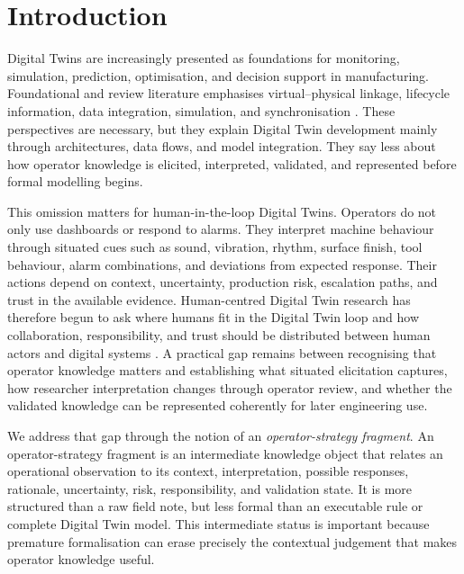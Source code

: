 \section{Introduction}
\label{sec:introduction}

Digital Twins are increasingly presented as foundations for monitoring, simulation, prediction, optimisation, and decision support in manufacturing. Foundational and review literature emphasises virtual--physical linkage, lifecycle information, data integration, simulation, and synchronisation \cite{grieves2017digital,kritzinger2018digital,fuller2020digital,negri2017review,semeraro2021digital}. These perspectives are necessary, but they explain Digital Twin development mainly through architectures, data flows, and model integration. They say less about how operator knowledge is elicited, interpreted, validated, and represented before formal modelling begins.

This omission matters for human-\allowbreak in-\allowbreak the-\allowbreak loop Digital Twins. Operators do not only use dashboards or respond to alarms. They interpret machine behaviour through situated cues such as sound, vibration, rhythm, surface finish, tool behaviour, alarm combinations, and deviations from expected response. Their actions depend on context, uncertainty, production risk, escalation paths, and trust in the available evidence. Human-centred Digital Twin research has therefore begun to ask where humans fit in the Digital Twin loop and how collaboration, responsibility, and trust should be distributed between human actors and digital systems \cite{agrawal2023humans,longo2022ubiquitous,lee2004trust,parasuraman2000levels}. A practical gap remains between recognising that operator knowledge matters and establishing what situated elicitation captures, how researcher interpretation changes through operator review, and whether the validated knowledge can be represented coherently for later engineering use.

We address that gap through the notion of an \emph{operator-strategy fragment}. An operator-strategy fragment is an intermediate knowledge object that relates an operational observation to its context, interpretation, possible responses, rationale, uncertainty, risk, responsibility, and validation state. It is more structured than a raw field note, but less formal than an executable rule or complete Digital Twin model. This intermediate status is important because premature formalisation can erase precisely the contextual judgement that makes operator knowledge useful.

